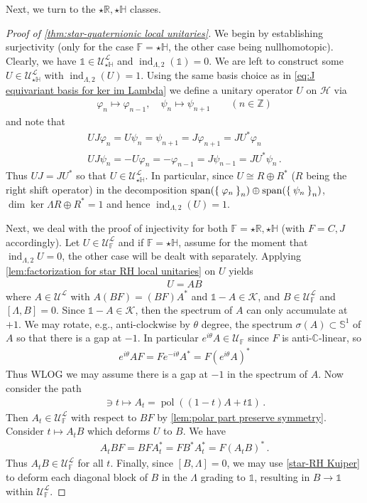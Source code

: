 \documentclass[a4paper,10pt]{article}
\numberwithin{equation}{section}
\theoremstyle{plain}
\theoremstyle{plain}
\theoremstyle{plain}
\theoremstyle{plain}
\theoremstyle{plain}
\theoremstyle{remark}
\theoremstyle{definition}
\theoremstyle{plain}
\newcommand{\ZZ}{\mathbb{Z}}
\newcommand{\bS}{\mathbb{S}}
\newcommand{\RR}{\mathbb{R}}
\newcommand{\CC}{\mathbb{C}}
\newcommand{\FF}{\mathbb{F}}
\newcommand{\calU}{\mathcal{U}}
\newcommand{\calH}{\mathcal{H}}
\newcommand{\calK}{\mathcal{K}}
\newcommand{\calL}{\mathcal{L}}
\newcommand{\bbLambda}{\mathbb{\Lambda}}
\newcommand{\szpan}{\operatorname{span}}
\newcommand{\vf}{\varphi}
\newcommand{\Id}{\mathds{1}}
\newcommand{\HH}{\mathbb{H}}
\newcommand{\findex}{\operatorname{ind}}
\newcommand{\eq}[1]{\begin{align*}#1\end{align*}}
\newcommand{\polar}{\operatorname{pol}}
\begin{document}
	
	Next, we turn to the $\star\RR,\star\HH$ classes. 
	\begin{proof}[Proof of \cref{thm:star-quaternionic local unitaries}] 
		We begin by establishing surjectivity (only for the case $\FF=\star\HH$, the other case being nullhomotopic). Clearly, we have $\Id\in\calU_{\star\HH}^\calL$ and $\findex_{\Lambda,2}(\Id)=0$. We are left to construct some $U\in\calU_{\star\HH}^\calL$ with $\findex_{\Lambda,2}(U)=1$. Using the same basis choice as in \cref{eq:J equivariant basis for ker im Lambda} we define a unitary operator $U$ on $\calH$ via \eq{\vf_n\mapsto \vf_{n-1}, \quad \psi_n\mapsto \psi_{n+1}\qquad (n\in \ZZ)} and note that \eq{UJ\vf_n=U\psi_n=\psi_{n+1}=J\vf_{n+1}=JU^*\vf_n \\ UJ\psi_n=-U\vf_n=-\vf_{n-1}=J\psi_{n-1}=JU^*\psi_{n}\,.}
		Thus $UJ=JU^*$ so that $U\in\calU^\calL_{\star\HH}$. In particular, since $U\cong R\oplus R^\ast$ ($R$ being the right shift operator) in the decomposition $\szpan(\Set{\vf_n}_n)\oplus\szpan(\Set{\psi_n}_n)$, $\dim\ker\bbLambda R\oplus R^\ast = 1$ and hence $\findex_{\Lambda,2}(U)=1$.
		
		
		
		Next, we deal with the proof of injectivity for both $\FF=\star\RR,\star\HH$ (with $F=C,J$ accordingly). Let $U\in\calU_\FF^\calL$ and if $\FF=\star\HH$, assume for the moment that $\findex_{\Lambda,2}U=0$, the other case will be dealt with separately. 
		Applying \cref{lem:factorization for star RH local unitaries} on $U$ yields \eq{U=AB} where $A\in\calU^\calL$ with $A(BF)=(BF)A^*$ and $\Id-A\in\calK$, and $B\in\calU_\FF^\calL$ and $[\Lambda,B]=0$. Since $\Id-A\in\calK$, then the spectrum of $A$ can only accumulate at $+1$. We may rotate, e.g., anti-clockwise by $\theta$ degree, the spectrum $\sigma(A)\subset \bS^1$ of $A$ so that there is a gap at $-1$. 
		In particular $e^{i\theta}A\in\calU_\FF$ since $F$ is anti-$\CC$-linear, so \eq{e^{i\theta}A F=F e^{-i\theta}A^\ast=F(e^{i\theta}A)^*} Thus WLOG we may assume there is a gap at $-1$ in the spectrum of $A$. Now consider the path \eq{[0,1]\ni t\mapsto A_t=\polar((1-t)A+t\Id)\,.} 
		Then $A_t\in\calU^\calL_\FF$ with respect to $BF$ by \cref{lem:polar part preserve symmetry}. Consider $t\mapsto A_tB$ which deforms $U$ to $B$. We have \eq{A_tB F=BFA_t^*=FB^*A_t^*=F (A_tB)^*\,.} 
		Thus $A_tB\in\calU_\FF^\calL$ for all $t$. 
		Finally, since $[B,\Lambda]=0$, we may use \cref{star-RH Kuiper} to deform each diagonal block of $B$ in the $\Lambda$ grading to $\Id$, resulting in $B\to \Id$ within $\calU_\FF^\calL$.
		

\end{proof}
\end{document}
